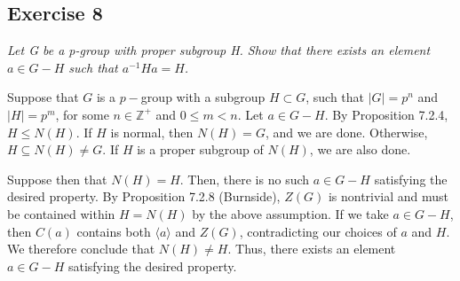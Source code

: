 \subsection*{Exercise 8}
\textit{Let G be a p-group with proper subgroup H. Show that there exists an element $a \in G - H$ such that $a^{-1}Ha = H$.}

\vspace{5 mm}
Suppose that $G$ is a $p-$group with a subgroup $H \subset G$, such that $|G| = p^n$ and $|H| = p^m$, for some $n \in \mathbb{Z}^+$ and $0 \le m < n$. Let $a \in G - H$. By Proposition 7.2.4, $H \le N(H)$. If $H$ is normal, then $N(H) = G$, and we are done. Otherwise, $H \subseteq N(H) \not= G$. If $H$ is a proper subgroup of $N(H)$, we are also done. 

Suppose then that $N(H) = H$. Then, there is no such $a \in G - H$ satisfying the desired property. By Proposition 7.2.8 (Burnside), $Z(G)$ is nontrivial and must be contained within $H = N(H)$ by the above assumption. If we take $a \in G - H$, then $C(a)$ contains both $\langle a \rangle$ and $Z(G)$, contradicting our choices of $a$ and $H$. We therefore conclude that $N(H) \not= H$. Thus, there exists an element $a \in G - H$ satisfying the desired property.